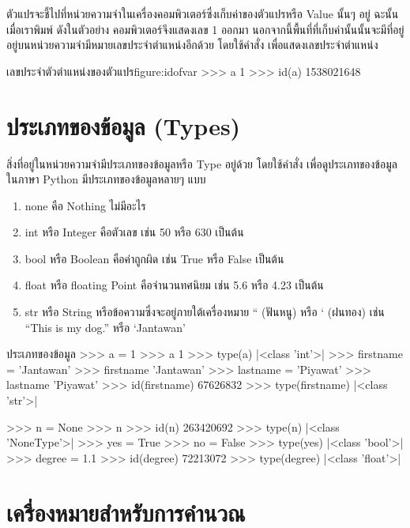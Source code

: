 ตัวแปรจะชี้ไปที่หน่วยความจำในเครื่องคอมพิวเตอร์ซึ่งเก็บค่าของตัวแปรหรือ Value นั้นๆ อยู่ ฉะนั้นเมื่อเราพิมพ์  ดังในตัวอย่าง คอมพิวเตอร์จึงแสดงเลข 1 ออกมา นอกจากนี้พื้นที่ที่เก็บค่านั้นนั้นจะมีที่อยู่อยู่บนหน่วยความจำมีหมายเลขประจำตำแหน่งอีกด้วย โดยใช้คำสั่ง  เพื่อแสดงเลขประจำตำแหน่ง

\begin{codelist}{เลขประจำตัวตำแหน่งของตัวแปร}{figure:idofvar}
>>> a
1
>>> id(a)
1538021648
\end{codelist}

\section{ประเภทของข้อมูล (Types)}

สิ่งที่อยู่ในหน่วยความจำมีประเภทของข้อมูลหรือ Type อยู่ด้วย โดยใช้คำสั่ง  เพื่อดูประเภทของข้อมูล ในภาษา Python มีประเภทของข้อมูลหลายๆ แบบ \cite{Luc15}

\begin{enumerate}[noitemsep]
\item none คือ Nothing ไม่มีอะไร 
\item int หรือ Integer คือตัวเลข เช่น 50 หรือ 630 เป็นต้น
\item bool หรือ Boolean คือค่าถูกผิด เช่น True หรือ False เป็นต้น
\item float หรือ floating Point คือจำนวนทศนิยม เช่น 5.6 หรือ 4.23 เป็นต้น
\item str หรือ String หรือข้อความซึ่งจะอยู่ภายใต้เครื่องหมาย `` (ฟันหนู) หรือ ` (ฝนทอง) เช่น ``This is my dog.''  หรือ `Jantawan'
\end{enumerate}

\begin{codelist}{ประเภทของข้อมูล}{}
>>> a = 1
>>> a
1
>>> type(a)
|<class \rq{}int\rq{}>|
>>> firstname = 'Jantawan'
>>> firstname
'Jantawan'
>>> lastname = 'Piyawat'
>>> lastname
'Piyawat'
>>> id(firstname)
67626832
>>> type(firstname)
|<class \rq{}str\rq{}>|
\end{codelist}


\begin{codelist}{}{}
>>> n = None
>>> n
>>> id(n)
263420692
>>> type(n)
|<class \rq{}NoneType\rq{}>|
>>> yes = True
>>> no = False
>>> type(yes)
|<class \rq{}bool\rq{}>|
>>> degree = 1.1
>>> id(degree)
72213072
>>> type(degree)
|<class \rq{}float\rq{}>|
\end{codelist}


\section{เครื่องหมายสำหรับการคำนวณ}
